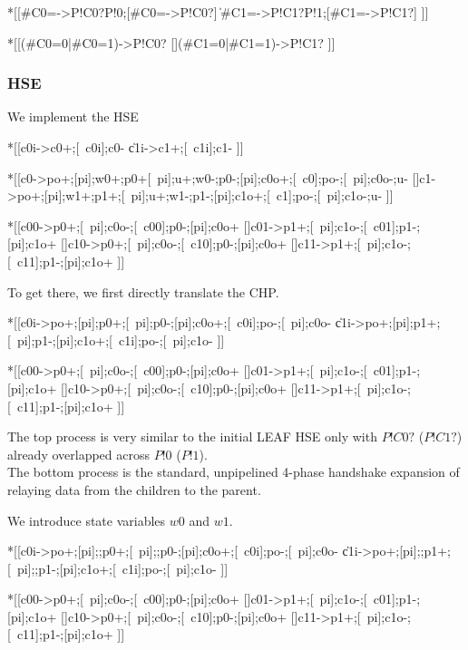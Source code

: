 \documentclass{article}
\begin{document}
\begin{csp}
*[[#{C0=\neg\emptyset}->P!C0?\*P!0;[#{C0=\emptyset}->P!C0?]
  \|#{C1=\neg\emptyset}->P!C1?\*P!1;[#{C1=\emptyset}->P!C1?]
 ]]

*[[(#{C0=0}|#{C0=1})->P!C0?
  [](#{C1=0}|#{C1=1})->P!C1?
 ]]
\end{csp}

\subsubsection*{HSE}

We implement the HSE

\begin{hse}
*[[c0i->c0+;[~c0i];c0-
  \|c1i->c1+;[~c1i];c1-
 ]]

*[[c0->po+;[pi];w0+;p0+[~pi];u+;w0-;p0-;[pi];c0o+;[~c0];po-;[~pi];c0o-;u-
  []c1->po+;[pi];w1+;p1+;[~pi];u+;w1-;p1-;[pi];c1o+;[~c1];po-;[~pi];c1o-;u-
 ]]

*[[c00->p0+;[~pi];c0o-;[~c00];p0-;[pi];c0o+
  []c01->p1+;[~pi];c1o-;[~c01];p1-;[pi];c1o+
  []c10->p0+;[~pi];c0o-;[~c10];p0-;[pi];c0o+
  []c11->p1+;[~pi];c1o-;[~c11];p1-;[pi];c1o+
 ]]
\end{hse}

\noindent
To get there, we first directly translate the CHP.

\begin{hse}
*[[c0i->po+;[pi];p0+;[~pi];p0-;[pi];c0o+;[~c0i];po-;[~pi];c0o-
  \|c1i->po+;[pi];p1+;[~pi];p1-;[pi];c1o+;[~c1i];po-;[~pi];c1o-
 ]]

*[[c00->p0+;[~pi];c0o-;[~c00];p0-;[pi];c0o+
  []c01->p1+;[~pi];c1o-;[~c01];p1-;[pi];c1o+
  []c10->p0+;[~pi];c0o-;[~c10];p0-;[pi];c0o+
  []c11->p1+;[~pi];c1o-;[~c11];p1-;[pi];c1o+
 ]]
\end{hse}

\noindent
The top process is very similar to the initial LEAF HSE only with 
$P!C0?$ ($P!C1?$) already overlapped across $P!0$ ($P!1$). \\
The bottom process is the standard, unpipelined 4-phase handshake expansion 
of relaying data from the children to the parent.

\noindent
We introduce state variables $w0$ and $w1$.

\begin{hse}
*[[c0i->po+;[pi];;p0+;[~pi];;p0-;[pi];c0o+;[~c0i];po-;[~pi];c0o-
  \|c1i->po+;[pi];;p1+;[~pi];;p1-;[pi];c1o+;[~c1i];po-;[~pi];c1o-
 ]]

*[[c00->p0+;[~pi];c0o-;[~c00];p0-;[pi];c0o+
  []c01->p1+;[~pi];c1o-;[~c01];p1-;[pi];c1o+
  []c10->p0+;[~pi];c0o-;[~c10];p0-;[pi];c0o+
  []c11->p1+;[~pi];c1o-;[~c11];p1-;[pi];c1o+
 ]]
\end{hse}
\end{document}

